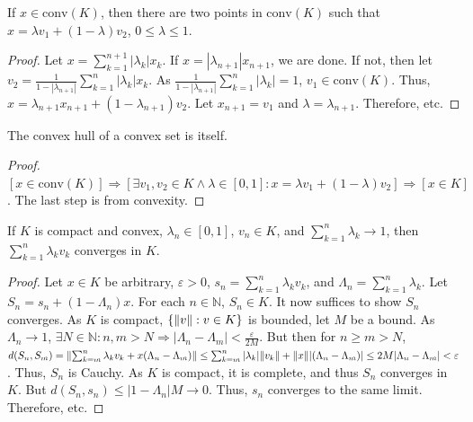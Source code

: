 \documentclass[crop=false,class=book,oneside]{standalone}
\begin{document}
            \begin{lemma}
            If $x\in \textrm{conv}(K)$, then there are two points in $\textrm{conv}(K)$ such that $x = \lambda v_1 +(1- \lambda) v_2$, $0 \leq \lambda \leq 1$.
            \end{lemma}
            \begin{proof}
            Let $x=\sum_{k=1}^{n+1}|\lambda_k| x_k$. If $x=|\lambda_{n+1}|x_{n+1}$, we are done. If not, then let $v_2 = \frac{1}{1-|\lambda_{n+1}|}\sum_{k=1}^{n}|\lambda_k|x_k$. As $\frac{1}{1-|\lambda_{n+1}|}\sum_{k=1}^{n}|\lambda_k| = 1$, $v_1\in \textrm{conv}(K)$. Thus, $x = \lambda_{n+1}x_{n+1}+(1-\lambda_{n+1})v_2$. Let $x_{n+1}=v_1$ and $\lambda = \lambda_{n+1}$. Therefore, etc.
            \end{proof}
            \begin{theorem}
            The convex hull of a convex set is itself.
            \end{theorem}
            \begin{proof}
            $[x\in \textrm{conv}(K)]\Rightarrow [\exists v_1,v_2\in K\land \lambda\in[0,1]:x=\lambda v_1+(1-\lambda)v_2]\Rightarrow [x\in K]$. The last step is from convexity.
            \end{proof}
            \begin{theorem}
            If $K$ is compact and convex, $\lambda_n\in[0,1]$, $v_n\in K$, and $\sum_{k=1}^{n}\lambda_k \rightarrow 1$, then $\sum_{k=1}^{n}\lambda_k v_k$ converges in $K$.
            \end{theorem}
            \begin{proof}
            Let $x\in K$ be arbitrary, $\varepsilon>0$, $s_n = \sum_{k=1}^{n}\lambda_k v_k$, and $\Lambda_n = \sum_{k=1}^{n}\lambda_k$. Let $S_n = s_n + (1-\Lambda_n)x$. For each $n\in \mathbb{N}$, $S_n\in K$. It now suffices to show $S_n$ converges. As $K$ is compact, $\{\lVert v\rVert:v\in K\}$ is bounded, let $M$ be a bound. As $\Lambda_n\rightarrow 1$, $\exists N\in \mathbb{N}:n,m>N\Rightarrow |\Lambda_n-\Lambda_m|<\frac{\varepsilon}{2M}$. But then for $n\geq m >N$, $d(S_n,S_m) = \lVert\sum_{k=m}^{n}\lambda_k v_k+x(\Lambda_n-\Lambda_m)\rVert \leq \sum_{k=m}^{n}|\lambda_k| \lVert v_k\rVert+\lVert x\rVert|(\Lambda_n-\Lambda_m)|\leq 2M|\Lambda_{n}-\Lambda_{m}|<\varepsilon$. Thus, $S_n$ is Cauchy. As $K$ is compact, it is complete, and thus $S_n$ converges in $K$. But $d(S_n,s_n)\leq |1-\Lambda_n|M\rightarrow 0$. Thus, $s_n$ converges to the same limit. Therefore, etc.
            \end{proof}
\end{document}
